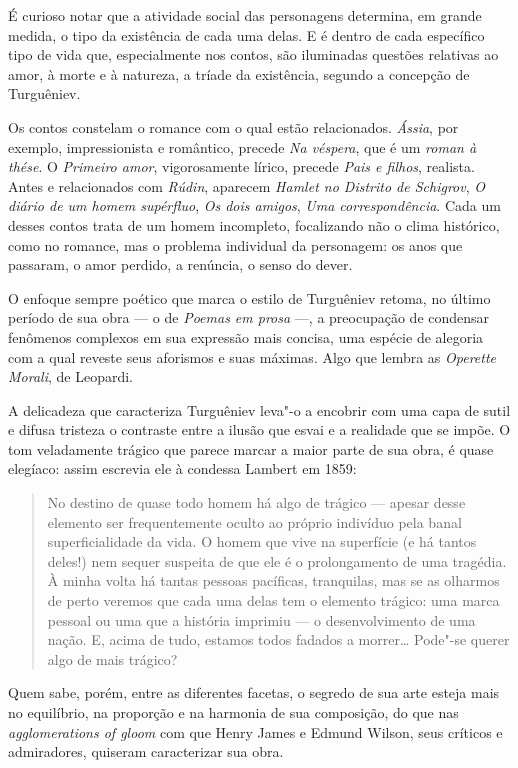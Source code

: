 É curioso notar que a atividade social das personagens determina, em grande
medida, o tipo da existência de cada uma delas. E é dentro de cada
específico tipo de vida que, especialmente nos contos, são iluminadas
questões relativas ao amor, à morte e à natureza, a tríade da
existência, segundo a concepção de Turguêniev.

Os contos constelam o romance com o qual estão relacionados.
\emph{Ássia}, por exemplo, impressionista e romântico, precede \emph{Na
véspera}, que é um \emph{roman à thése}. O \emph{Primeiro amor},
vigorosamente lírico, precede \emph{Pais e filhos}, realista. Antes e relacionados
com \emph{Rúdin}, aparecem \emph{Hamlet no Distrito de Schigrov}, \emph{O
diário de um homem supérfluo}, \emph{Os dois amigos}, \emph{Uma
correspondência}. Cada um desses contos trata de um homem incompleto,
focalizando não o clima histórico, como no romance, mas o problema
individual da personagem: os anos que passaram, o amor perdido, a
renúncia, o senso do dever.

O enfoque sempre poético que marca o estilo de Turguêniev retoma, no
último período de sua obra --- o de \emph{Poemas em prosa} ---, a
preocupação de condensar fenômenos complexos em sua expressão mais
concisa, uma espécie de alegoria com a qual reveste seus aforismos e
suas máximas. Algo que lembra as \emph{Operette Morali}, de Leopardi.

A delicadeza que caracteriza Turguêniev leva"-o a encobrir com uma capa
de sutil e difusa tristeza o contraste entre a ilusão que esvai e a
realidade que se impõe. O tom veladamente trágico que parece marcar a
maior parte de sua obra, é quase elegíaco: assim escrevia ele à condessa
Lambert em 1859:

\begin{quote}
No destino de quase todo homem há algo de trágico --- apesar desse
elemento ser frequentemente oculto ao próprio indivíduo pela banal
superficialidade da vida. O homem que vive na superfície (e há tantos
deles!) nem sequer suspeita de que ele é o prolongamento de uma
tragédia. À minha volta há tantas pessoas pacíficas, tranquilas, mas se as
olharmos de perto veremos que cada uma delas tem o elemento trágico: uma
marca pessoal ou uma que a história imprimiu --- o desenvolvimento de uma
nação. E, acima de tudo, estamos todos fadados a morrer\ldots{} Pode"-se
querer algo de mais trágico?
\end{quote}

Quem sabe, porém, entre as diferentes facetas, o segredo de sua arte esteja mais no
equilíbrio, na proporção e na harmonia de sua composição, do que nas
\emph{agglomerations of gloom} com que Henry James e Edmund Wilson, seus
críticos e admiradores, quiseram caracterizar sua obra.

